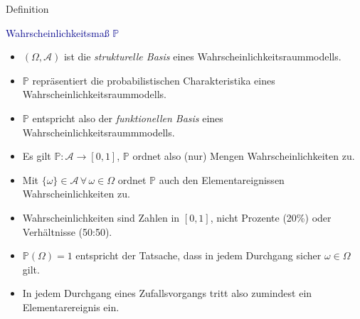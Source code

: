 \documentclass[
  8pt,
  ignorenonframetext,
]{beamer}
\providecommand{\tightlist}{%
  \setlength{\itemsep}{0pt}\setlength{\parskip}{0pt}}
\begin{document}
\begin{frame}{Definition}
\protect\hypertarget{definition-7}{}

\textcolor{darkblue}{Wahrscheinlichkeitsmaß $\mathbb{P}$}

\small

\begin{itemize}
\tightlist
\item
  \justifying \((\Omega,\mathcal{A})\) ist die \emph{strukturelle Basis}
  eines Wahrscheinlichkeitsraummodells.
\item
  \(\mathbb{P}\) repräsentiert die probabilistischen Charakteristika
  eines Wahrscheinlichkeitsraummodells.
\item
  \(\mathbb{P}\) entspricht also der \emph{funktionellen Basis} eines
  Wahrscheinlichkeitsraummmodells.
\item
  Es gilt \(\mathbb{P}: \mathcal{A} \to [0,1]\), \(\mathbb{P}\) ordnet
  also (nur) Mengen Wahrscheinlichkeiten zu.
\item
  Mit \(\{\omega\} \in \mathcal{A}\, \forall\, \omega \in \Omega\)
  ordnet \(\mathbb{P}\) auch den Elementareignissen Wahrscheinlichkeiten
  zu.
\item
  Wahrscheinlichkeiten sind Zahlen in \([0,1]\), nicht Prozente (20\%)
  oder Verhältnisse (50:50).
\item
  \(\mathbb{P}(\Omega) = 1\) entspricht der Tatsache, dass in jedem
  Durchgang sicher \(\omega \in \Omega\) gilt.
\item
  In jedem Durchgang eines Zufallsvorgangs tritt also zumindest ein
  Elementarereignis ein.
\end{itemize}
\end{frame}
\end{document}
